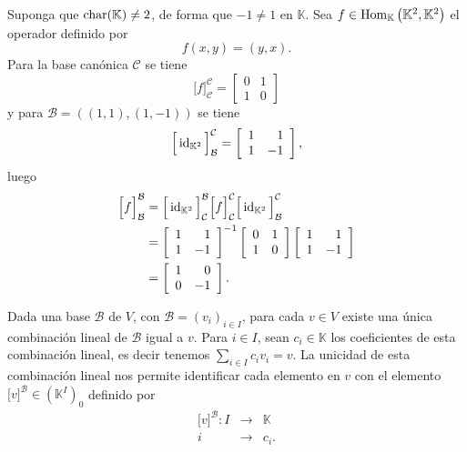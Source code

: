 \begin{ejem}
Suponga que $\operatorname{char}(\mathbb{K})\ne 2$, de forma que $-1\ne 1$ en $\mathbb{K}$. Sea $f\in\operatorname{Hom}_{\mathbb{K}}\left(\mathbb{K}^2,\mathbb{K}^2\right)$ el operador definido por
$$f(x,y)=(y,x).$$
Para la base canónica $\mathcal{C}$ se tiene
$$\Big[ f\Big]^{\mathcal{C}}_{\mathcal{C}}=
\left[\begin{array}{rr}
0 & 1\\ 1 & 0
\end{array}\right]
$$
y para $\mathcal{B}=\left((1,1),(1,-1)\right)$ se tiene
$$\Big[ \operatorname{id}_{\mathbb{K}^2}\Big]^{\mathcal{C}}_{\mathcal{B}}=
\left[\begin{array}{rr}
1 & 1\\ 1 & -1
\end{array}\right],
$$
luego
\begin{align*}
\Big[ f\Big]^{\mathcal{B}}_{\mathcal{B}} &= \Big[ \operatorname{id}_{\mathbb{K}^2}\Big]^{\mathcal{B}}_{\mathcal{C}}\Big[ f\Big]^{\mathcal{C}}_{\mathcal{C}}\Big[ \operatorname{id}_{\mathbb{K}^2}\Big]^{\mathcal{C}}_{\mathcal{B}}\\
 &=\left[\begin{array}{rr}
1 & 1\\ 1 & -1
\end{array}\right]^{-1}
\left[\begin{array}{rr}
0 & 1\\ 1 & 0
\end{array}\right]
\left[\begin{array}{rr}
1 & 1\\ 1 & -1
\end{array}\right]\\
 &= \left[\begin{array}{rr}
1 & 0\\ 0 & -1
\end{array}\right].
\end{align*}
\end{ejem}

\begin{obs}\label{defnvectcoorinfty}
Dada una base $\mathcal{B}$ de $V$, con $\mathcal{B}=(v_i)_{i\in I}$, para cada $v\in V$ existe una \'unica combinaci\'on lineal de $\mathcal{B}$ igual a $v$. Para $i\in I$, sean $c_i\in \mathbb{K}$ los coeficientes de esta combinaci\'on lineal, es decir tenemos $\sum_{i\in I} c_iv_i=v$.
La unicidad de esta combinaci\'on lineal nos permite identificar cada elemento en $v$ con el elemento $\Big[v\Big]^\mathcal{B}\in\left(\mathbb{K}^I\right)_0$ definido por
\begin{eqnarray*}
\Big[v\Big]^\mathcal{B}: I & \longrightarrow & \mathbb{K}\\
i & \longrightarrow & c_i.
\end{eqnarray*}
\end{obs}

